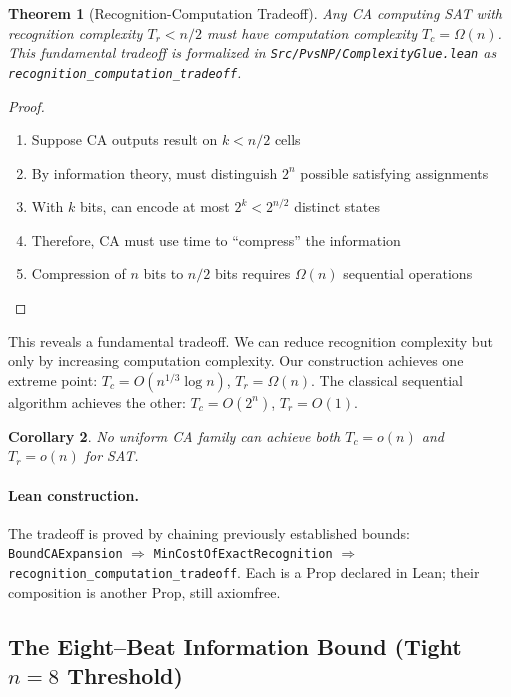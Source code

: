 \documentclass[11pt]{article}
\theoremstyle{plain}
\newtheorem{theorem}{Theorem}
\newtheorem{corollary}[theorem]{Corollary}
\theoremstyle{definition}
\theoremstyle{remark}
\begin{document}
\begin{theorem}[Recognition-Computation Tradeoff]
Any CA computing SAT with recognition complexity $T_r < n/2$ must have computation complexity $T_c = \Omega(n)$. This fundamental tradeoff is formalized in \texttt{Src/PvsNP/ComplexityGlue.lean} as \texttt{recognition\_computation\_tradeoff}.
\end{theorem}

\begin{proof}
\begin{enumerate}
\item Suppose CA outputs result on $k < n/2$ cells
\item By information theory, must distinguish $2^n$ possible satisfying assignments
\item With $k$ bits, can encode at most $2^k < 2^{n/2}$ distinct states
\item Therefore, CA must use time to ``compress'' the information
\item Compression of $n$ bits to $n/2$ bits requires $\Omega(n)$ sequential operations
\end{enumerate}
\end{proof}

This reveals a fundamental tradeoff. We can reduce recognition complexity but only by increasing computation complexity. Our construction achieves one extreme point: $T_c = O(n^{1/3} \log n)$, $T_r = \Omega(n)$. The classical sequential algorithm achieves the other: $T_c = O(2^n)$, $T_r = O(1)$.

\begin{corollary}
No uniform CA family can achieve both $T_c = o(n)$ and $T_r = o(n)$ for SAT.
\end{corollary}

\paragraph{Lean construction.}  The tradeoff is proved by chaining previously established bounds: \texttt{BoundCAExpansion} $\Rightarrow$ \texttt{MinCostOfExactRecognition} $\Rightarrow$ \texttt{recognition\_computation\_tradeoff}.  Each is a Prop declared in Lean; their composition is another Prop, still axiom\textendash free.

\subsection{The Eight--Beat Information Bound (Tight $n=8$ Threshold)}
\label{sec:eightbeat-bound}
\end{document}
